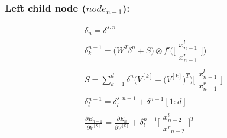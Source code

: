 \documentclass{article}
\begin{document}
	\subsubsection*{Left child node ($node_{n-1}$):}
		\begin{equation}
			\begin{split}
				\delta_{n} = \delta^{s,n} \\
				\delta^{n-1}_{k} = \big( W^T \delta^n + S \big) 
				\otimes f' \bigg( \bigg[ \begin{array}{c} x^l_{n-1}\\ x^r_{n-1} \end{array} \bigg] \bigg) \\
				S = \sum\limits_{k = 1}^d \delta^n \bigg( V^{[k]} + \big(V^{[k]})^T \bigg) \bigg[ \begin{array}{c} x^l_{n-1}\\ x^r_{n-1} \end{array} \bigg] \\
				\delta^{n-1}_l = \delta_l^{s,n-1} + \delta^{n-1}[1:d] \\
				\frac{\partial E_{n-1}}{\partial V^{[k]}} = 
				\frac{\partial E_n}{\partial V^{[k]}} + \delta^{n-1}_l \bigg[  \begin{array}{c} x_{n-2}^l \\ x^{r}{_{n-2}} \end{array} \bigg]^T
			\end{split}
		\end{equation}
\end{document}
